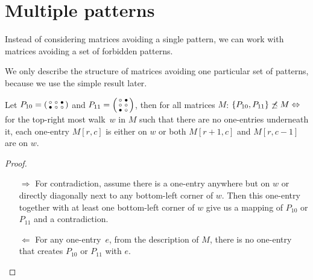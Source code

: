 \section{Multiple patterns}
Instead of considering matrices avoiding a single pattern, we can work with matrices avoiding a set of forbidden patterns.

We only describe the structure of matrices avoiding one particular set of patterns, because we use the simple result later.

\begin{prop}
\label{prop:twopatterns}
Let $P_{10}=\left(\begin{smallmatrix}\circ&\circ&\bullet\\\bullet&\circ&\circ\end{smallmatrix}\right)$ and $P_{11}=\left(\begin{smallmatrix}\circ&\bullet\\\circ&\circ\\\bullet&\circ\end{smallmatrix}\right)$, then for all matrices $M$: $\{P_{10},P_{11}\}\not\preceq M\Leftrightarrow$ for the top-right most walk~$w$ in $M$ such that there are no one-entries underneath it, each one-entry $M[r,c]$ is either on $w$ or both $M[r+1,c]$ and $M[r,c-1]$ are on $w$.
\end{prop}
\begin{proof}
\begin{itemize}
	\item[$\Rightarrow$] For contradiction, assume there is a one-entry anywhere but on $w$ or directly diagonally next to any bottom-left corner of $w$. Then this one-entry together with at least one bottom-left corner of $w$ give us a mapping of $P_{10}$ or $P_{11}$ and a contradiction.
	\item[$\Leftarrow$] For any one-entry~$e$, from the description of $M$, there is no one-entry that creates $P_{10}$ or $P_{11}$ with $e$.
\end{itemize}
\end{proof}
